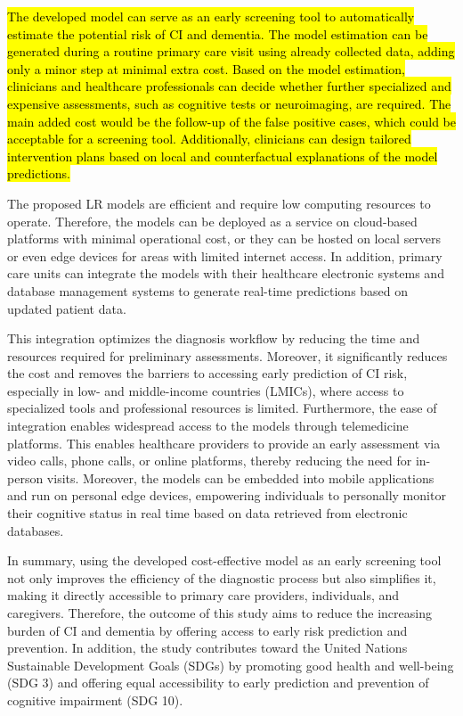 \hl{The developed model can serve as an early screening tool to automatically estimate the potential risk of CI and dementia. The model estimation can be generated during a routine primary care visit using already collected data, adding only a minor step at minimal extra cost. Based on the model estimation, clinicians and healthcare professionals can decide whether further specialized and expensive assessments, such as cognitive tests or neuroimaging, are required. The main added cost would be the follow-up of the false positive cases, which could be acceptable for a screening tool. Additionally, clinicians can design tailored intervention plans based on local and counterfactual explanations of the model predictions.}

The proposed LR models are efficient and require low computing resources to operate. Therefore, the models can be deployed as a service on cloud-based platforms with minimal operational cost, or they can be hosted on local servers or even edge devices for areas with limited internet access. In addition, primary care units can integrate the models with their healthcare electronic systems and database management systems to generate real-time predictions based on updated patient data.

This integration optimizes the diagnosis workflow by reducing the time and resources required for preliminary assessments. Moreover, it significantly reduces the cost and removes the barriers to accessing early prediction of CI risk, especially in low- and middle-income countries (\acrshort{LMICs}), where access to specialized tools and professional resources is limited. Furthermore, the ease of integration enables widespread access to the models through telemedicine platforms. This enables healthcare providers to provide an early assessment via video calls, phone calls, or online platforms, thereby reducing the need for in-person visits. Moreover, the models can be embedded into mobile applications and run on personal edge devices, empowering individuals to personally monitor their cognitive status in real time based on data retrieved from electronic databases.

In summary, using the developed cost-effective model as an early screening tool not only improves the efficiency of the diagnostic process but also simplifies it, making it directly accessible to primary care providers, individuals, and caregivers. Therefore, the outcome of this study aims to reduce the increasing burden of CI and dementia by offering access to early risk prediction and prevention. In addition, the study contributes toward the United Nations Sustainable Development Goals (\acrshort{SDGs}) by promoting good health and well-being (SDG 3) and offering equal accessibility to early prediction and prevention of cognitive impairment (SDG 10).

